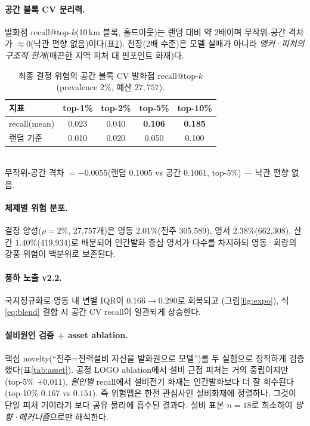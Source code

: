 \documentclass[11pt,a4paper]{article}
\begin{document}
\paragraph{공간 블록 CV 분리력.} 발화점 recall@top-$k$(10\,km 블록, 홀드아웃)는 랜덤 대비 약 2배이며
무작위-공간 격차가 $\approx 0$(낙관 편향 없음)이다(표\ref{tab:recall}). 천장(2배 수준)은 모델 실패가
아니라 \emph{앵커·피처의 구조적 한계}(매끈한 지역 피처 대 핀포인트 화재)다.

\begin{table}[H]
\centering
\caption{최종 결정 위험의 공간 블록 CV 발화점 recall@top-$k$(prevalence $2\%$, 예산 $27{,}757$).}
\label{tab:recall}
\small
\begin{tabular}{lcccc}
\toprule
지표 & top-1\% & top-2\% & top-5\% & top-10\% \\
\midrule
recall(mean) & 0.023 & 0.040 & \textbf{0.106} & \textbf{0.185} \\
랜덤 기준    & 0.010 & 0.020 & 0.050 & 0.100 \\
\bottomrule
\end{tabular}\\[2pt]
{\footnotesize 무작위-공간 격차 $=-0.0055$(랜덤 $0.1005$ vs 공간 $0.1061$, top-5\%) — 낙관 편향 없음.}
\end{table}

\paragraph{체제별 위험 분포.} 결정 양성($\rho{=}2\%$, 27{,}757개)은 영동 $2.01\%$(전주 305{,}589),
영서 $2.38\%$(662{,}308), 산간 $1.40\%$(419{,}934)로 배분되어 인간발화 중심 영서가 다수를 차지하되
영동·회랑의 강풍 위험이 백분위로 보존된다.

\paragraph{풍하 노출 v2.2.} 국지정규화로 영동 내 변별 IQR이 $0.166\!\to\!0.290$로 회복되고
(그림\ref{fig:expo}), 식\eqref{eq:blend} 결합 시 공간 CV recall이 일관되게 상승한다.

\paragraph{설비원인 검증 + asset ablation.} 핵심 novelty(``전주=전력설비 자산을 발화원으로 모델'')를
두 실험으로 정직하게 검증했다(표\ref{tab:asset}). 공정 LOGO ablation에서 설비 근접 피처는 거의
중립이지만(top-5\% $+0.011$), \emph{원인별} recall에서 설비전기 화재는 인간발화보다 더 잘 회수된다
(top-10\% $0.167$ vs $0.151$). 즉 위험맵은 한전 관심사인 설비화재에 정렬하나, 그것이 단일 피처 기여라기
보다 공유 물리에 흡수된 결과다. 설비 표본 $n{=}18$로 희소하여 \emph{방향·메커니즘}으로만 해석한다.
\end{document}
